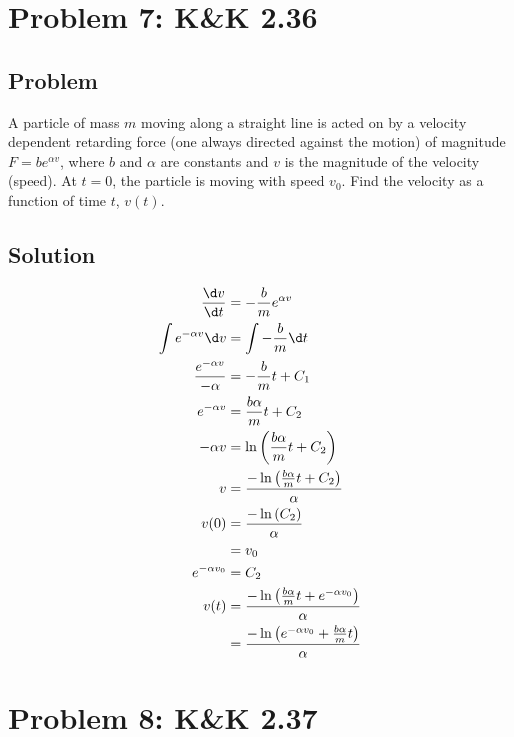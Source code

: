 \documentclass[solutions]{esg8012pset}
\begin{document}
\section*{Problem 7: K\&K 2.36}
\subsection*{Problem}
  A particle of mass $m$ moving along a straight line is acted on by a velocity dependent retarding force (one always directed against the motion) of magnitude $F = be^{\alpha v}$, where $b$ and $\alpha$ are constants and $v$ is the magnitude of the velocity (speed). At $t = 0$, the particle is moving with speed $v_0$. Find the velocity as a function of time $t$, $v(t)$.
\subsection*{Solution}
  \begin{align*}
    \frac{\d v}{\d t} & = -\frac{b}{m}e^{\alpha v} \\
    \int e^{-\alpha v} \d v & = \int -\frac{b}{m}\d t \\
    \frac{e^{-\alpha v}}{-\alpha} & = -\frac{b}{m}t + C_1 \\
    e^{-\alpha v} & = \frac{b\alpha}{m}t + C_2 \\
    -\alpha v & = \ln\left(\frac{b\alpha}{m}t + C_2\right) \\
    v & = \frac{-\ln\left(\frac{b\alpha}{m}t + C_2\right)}{\alpha} \\
    v(0) & = \frac{-\ln\left(C_2\right)}{\alpha} \\
         & = v_0 \\
    e^{-\alpha v_0} & = C_2 \\
    v(t) & = \frac{-\ln\left(\frac{b\alpha}{m}t + e^{-\alpha v_0}\right)}{\alpha} \\
     & = \frac{-\ln\left(e^{-\alpha v_0} + \frac{b\alpha}{m}t\right)}{\alpha}
  \end{align*}
\section*{Problem 8: K\&K 2.37}
\end{document}
